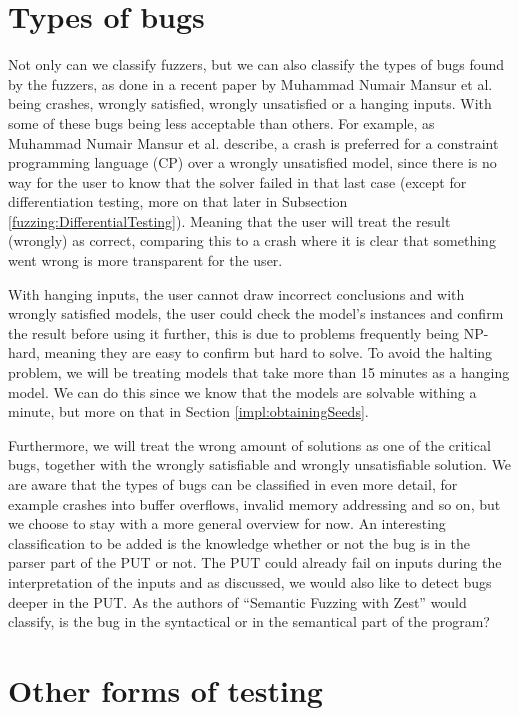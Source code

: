 \section{Types of bugs}
\label{fuzzing:TypesOfBugs}
Not only can we classify fuzzers, but we can also classify the types of bugs found by the fuzzers, as done in a recent paper \cite{1mansur2020detecting} by Muhammad Numair Mansur et al. being crashes, wrongly satisfied, wrongly unsatisfied or a hanging inputs. With some of these bugs being less acceptable than others. For example, as Muhammad Numair Mansur et al. describe, a crash is preferred for a constraint programming language (CP) over a wrongly unsatisfied model, since there is no way for the user to know that the solver failed in that last case (except for differentiation testing, more on that later in Subsection \ref{fuzzing:DifferentialTesting}). Meaning that the user will treat the result (wrongly) as correct, comparing this to a crash where it is clear that something went wrong is more transparent for the user.

With hanging inputs, the user cannot draw incorrect conclusions and with wrongly satisfied models, the user could check the model’s instances and confirm the result before using it further, this is due to problems frequently being NP-hard, meaning they are easy to confirm but hard to solve. To avoid the halting problem, we will be treating models that take more than 15 minutes as a hanging model. We can do this since we know that the models are solvable withing a minute, but more on that in Section \ref{impl:obtainingSeeds}. 

Furthermore, we will treat the wrong amount of solutions as one of the critical bugs, together with the wrongly satisfiable and wrongly unsatisfiable solution. We are aware that the types of bugs can be classified in even more detail, for example crashes into buffer overflows, invalid memory addressing and so on, but we choose to stay with a more general overview for now. An interesting classification to be added is the knowledge whether or not the bug is in the parser part of the PUT or not. The PUT could already fail on inputs during the interpretation of the inputs and as discussed, we would also like to detect bugs deeper in the PUT. As the authors of “Semantic Fuzzing with Zest” \cite{22SemanticFuzzing} would classify, is the bug in the syntactical or in the semantical part of the program?

\section{Other forms of testing}
